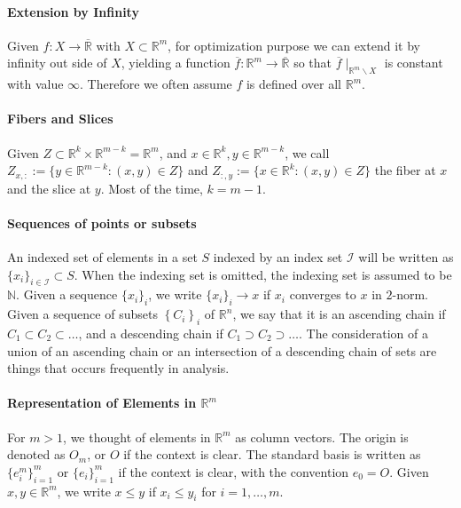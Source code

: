 \paragraph{Extension by Infinity}Given $f:X\to\overline{\mathbb{R}}$ with $X\subset \mathbb{R}^m$, for optimization purpose we can extend it by infinity out side of $X$, yielding a function $\overline{f}:\mathbb{R}^m\to\overline{\mathbb{R}}$ so that $\overline{f}\mid_{\mathbb{R}^m\smallsetminus X}$ is constant with value $\infty$. Therefore we often assume $f$ is defined over all $\mathbb{R}^m$.

\paragraph{Fibers and Slices}Given $Z\subset \mathbb{R}^{k}\times \mathbb{R}^{m-k}=\mathbb{R}^m$, and $x\in \mathbb{R}^k,y\in \mathbb{R}^{m-k}$, we call $Z_{x,:}:=\{y\in \mathbb{R}^{m-k}:(x,y)\in Z\}$ and $Z_{:,y}:=\{x\in \mathbb{R}^{k}:(x,y)\in Z\}$ the fiber at $x$ and the slice at $y$. Most of the time, $k=m-1$.

\paragraph{Sequences of points or subsets}An indexed set of elements in a set $S$ indexed by an index set $\mathcal{I}$ will be written as $\{x_i\}_{i\in \mathcal{I}}\subset S$. When the indexing set is omitted, the indexing set is assumed to be $\mathbb{N}$. Given a sequence $\{x_i\}_{i}$, we write $\{x_i\}_i\to x$ if $x_i$ converges to $x$ in $2$-norm. Given a sequence of subsets $\left\{C_i\right\}_{i}$ of $\mathbb{R}^n$, we say that it is an ascending chain if $C_1\subset C_2\subset \dotsc$, and a descending chain if $C_1\supset C_2\supset \dotsc$. The consideration of a union of an ascending chain or an intersection of a descending chain of sets are things that occurs frequently in analysis.

\paragraph{Representation of Elements in $\mathbb{R}^m$}For $m>1$, we thought of elements in $\mathbb{R}^m$ as column vectors. The origin is denoted as $O_m$, or $O$ if the context is clear. The standard basis is written as $\{e_i^m\}_{i=1}^m$ or $\{e_i\}_{i=1}^m$ if the context is clear, with the convention $e_0=O$. Given $x,y\in \mathbb{R}^m$, we write $x\leq y$ if $x_i\leq y_i$ for $i=1,\dotsc,m$.

